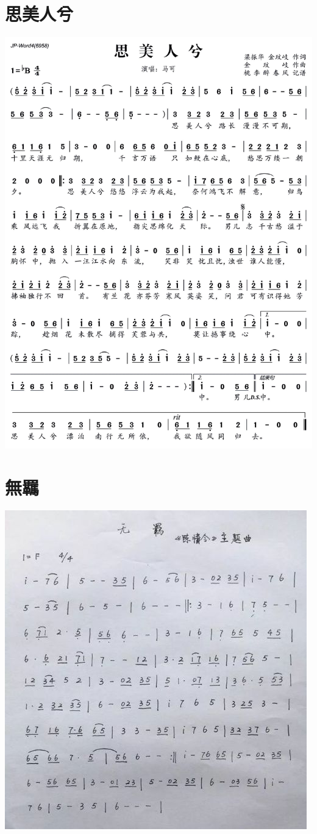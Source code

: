 \documentclass[cn,pad,twocol]{elegantbook}
\begin{document}
\section{思美人兮}
    \includegraphics[width=\textwidth]{dongxiao/20200402-思美人.jpg}
\section{無羈}
    \includegraphics[width=\textwidth]{dongxiao/20201231-無羈} 
\end{document}
